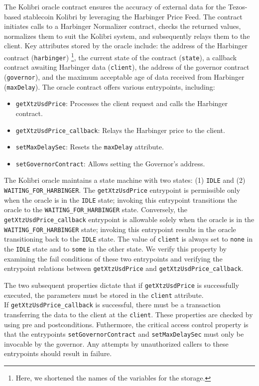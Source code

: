 \documentclass[runningheads]{llncs}
\begin{document}
The Kolibri oracle contract ensures the accuracy of external data for the Tezos-based stablecoin Kolibri by leveraging the Harbinger Price Feed. The contract initiates calls to a Harbinger Normalizer contract, checks the returned values, normalizes them to suit the Kolibri system, and subsequently relays them to the client. Key attributes stored by the oracle include: the address of the Harbinger contract (\lstinline/harbinger/) \footnote{Here, we shortened the names of the variables for the storage.}, the current state of the contract (\lstinline/state/), a callback contract awaiting Harbinger data (\lstinline/client/), the address of the governor contract (\lstinline/governor/), and the maximum acceptable age of data received from Harbinger (\lstinline/maxDelay/). The oracle contract offers various entrypoints, including:
\begin{itemize}
\item \lstinline/getXtzUsdPrice/: Processes the client request and calls the Harbinger contract.
\item \lstinline/getXtzUsdPrice_callback/: Relays the Harbinger price to the client.
\item \lstinline/setMaxDelaySec/: Resets the \lstinline/maxDelay/ attribute.
\item \lstinline/setGovernorContract/: Allows setting the Governor's address.
\end{itemize}

The Kolibri oracle maintains a state machine with two states: (1) \lstinline/IDLE/ and (2) \lstinline/WAITING_FOR_HARBINGER/. The \lstinline/getXtzUsdPrice/ entrypoint is permissible only when the oracle is in the \lstinline/IDLE/ state; invoking this entrypoint transitions the oracle to the \lstinline/WAITING_FOR_HARBINGER/ state. Conversely, the\\ \lstinline/getXtzUsdPrice_callback/ entrypoint is allowable solely when the oracle is in the \lstinline/WAITING_FOR_HARBINGER/ state; invoking this entrypoint results in the oracle transitioning back to the \lstinline/IDLE/ state. The value of \lstinline/client/ is always set to \lstinline/none/ in the \lstinline/IDLE/ state and to \lstinline/some/ in the other state. We verify this property by examining the fail conditions of these two entrypoints and verifying the entrypoint relations between \lstinline/getXtzUsdPrice/ and \lstinline/getXtzUsdPrice_callback/.

The two subsequent properties dictate that if \lstinline/getXtzUsdPrice/ is successfully executed, the parameters must be stored in the \lstinline/client/ attribute. \\ If \lstinline/getXtzUsdPrice_callback/ is successful, there must be a transaction transferring the data to the client at the \lstinline/client/. These properties are checked by using pre and postconditions. Futhermore, the critical access control property is that the entrypoints \lstinline/setGovernorContract/ and \lstinline/setMaxDelaySec/ must only be invocable by the governor. Any attempts by unauthorized callers to these entrypoints should result in failure.
\end{document}
